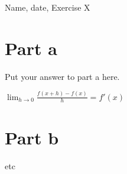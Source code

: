 \documentclass{article}
\begin{document}
Name, date, Exercise X

\section*{Part a}

Put your answer to part a here.

$\lim_{h \rightarrow 0} \frac{f(x + h) - f(x)}{h} = f'(x)$

\section*{Part b}

etc
\end{document}
